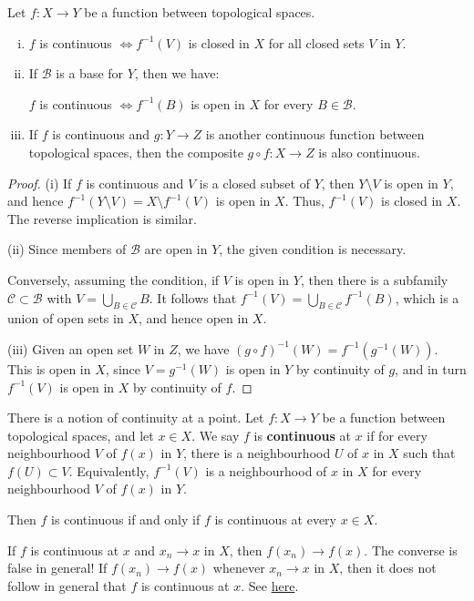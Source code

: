 \documentclass[a4paper]{article}
\begin{document}
\begin{proposition}\label{prop:4.8}
    Let $f: X \rightarrow Y$ be a function between topological spaces.

    \begin{enumerate}[(i)]
        \item $f$ is continuous $\Longleftrightarrow f^{-1}(V)$ is closed in $X$ for all closed sets $V$ in $Y$.

        \item If $\mathcal{B}$ is a base for $Y$, then we have:
    
        $f$ is continuous $\Longleftrightarrow f^{-1}(B)$ is open in $X$ for every $B \in \mathcal{B}$.
    
        \item If $f$ is continuous and $g: Y \rightarrow Z$ is another continuous function between topological spaces, then the composite $g \circ f: X \rightarrow Z$ is also continuous.
    \end{enumerate}
\end{proposition}
\begin{proof}
    (i) If $f$ is continuous and $V$ is a closed subset of $Y$, then $Y \setminus V$ is open in $Y$, and hence $f^{-1}(Y \setminus V)=X \setminus f^{-1}(V)$ is open in $X$. Thus, $f^{-1}(V)$ is closed in $X$. The reverse implication is similar.
    
    (ii) Since members of $\mathcal{B}$ are open in $Y$, the given condition is necessary.
    
    Conversely, assuming the condition, if $V$ is open in $Y$, then there is a subfamily $\mathcal{C} \subset \mathcal{B}$ with $V=\bigcup_{B \in \mathcal{C}} B$. It follows that $f^{-1}(V)=\bigcup_{B \in \mathcal{C}} f^{-1}(B)$, which is a union of open sets in $X$, and hence open in $X$.
    
    (iii) Given an open set $W$ in $Z$, we have $(g \circ f)^{-1}(W)=f^{-1}\left(g^{-1}(W)\right)$. This is open in $X$, since $V=g^{-1}(W)$ is open in $Y$ by continuity of $g$, and in turn $f^{-1}(V)$ is open in $X$ by continuity of $f$.
\end{proof}

\begin{remark}
    There is a notion of continuity at a point. Let $f: X \rightarrow Y$ be a function between topological spaces, and let $x \in X$. We say $f$ is \textbf{continuous} at $x$ if for every neighbourhood $V$ of $f(x)$ in $Y$, there is a neighbourhood $U$ of $x$ in $X$ such that $f(U) \subset V$. Equivalently, $f^{-1}(V)$ is a neighbourhood of $x$ in $X$ for every neighbourhood $V$ of $f(x)$ in $Y$.

    Then $f$ is continuous if and only if $f$ is continuous at every $x \in X$.

    If $f$ is continuous at $x$ and $x_{n} \rightarrow x$ in $X$, then $f\left(x_{n}\right) \rightarrow f(x)$. The converse is false in general! If $f\left(x_{n}\right) \rightarrow f(x)$ whenever $x_{n} \rightarrow x$ in $X$, then it does not follow in general that $f$ is continuous at $x$. See \href{https://math.stackexchange.com/questions/1419938/example-of-topological-spaces-where-sequential-continuity-does-not-imply-continu}{here}. 
\end{remark}
\end{document}

